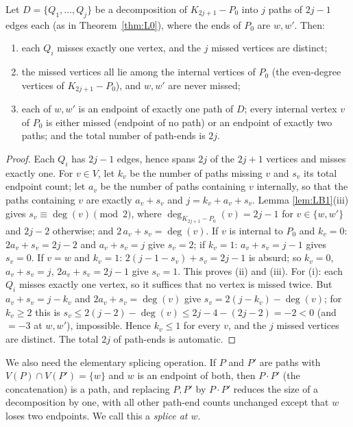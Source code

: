 \begin{lemma}\label{lem:slots}
Let $D=\{Q_1,\dots,Q_j\}$ be a decomposition of $K_{2j+1}-P_0$ into $j$ paths of $2j-1$ edges
each (as in Theorem~\ref{thm:L0}), where the ends of $P_0$ are $w,w'$. Then:
\begin{enumerate}[label={\rm(\roman*)},leftmargin=2em]
\item each $Q_i$ misses exactly one vertex, and the $j$ missed vertices are distinct;
\item the missed vertices all lie among the internal vertices of $P_0$ (the even-degree
vertices of $K_{2j+1}-P_0$), and $w,w'$ are never missed;
\item each of $w,w'$ is an endpoint of exactly one path of $D$; every internal vertex $v$ of
$P_0$ is either missed (endpoint of no path) or an endpoint of exactly two paths; and the
total number of path-ends is $2j$.
\end{enumerate}
\end{lemma}

\begin{proof}
Each $Q_i$ has $2j-1$ edges, hence spans $2j$ of the $2j+1$ vertices and misses exactly one.
For $v\in V$,
let $k_v$ be the number of paths missing $v$ and $s_v$ its total endpoint count; let $a_v$
be the number of paths containing $v$ internally, so that the paths containing $v$ are
exactly $a_v+s_v$ and $j=k_v+a_v+s_v$. Lemma
\ref{lem:LB1}(iii) gives $s_v\equiv\deg(v)\pmod 2$, where
$\deg_{K_{2j+1}-P_0}(v)=2j-1$ for $v\in\{w,w'\}$ and $2j-2$ otherwise; and
$2\,a_v+s_v=\deg(v)$. If $v$ is internal to $P_0$ and $k_v=0$:
$2a_v+s_v=2j-2$ and $a_v+s_v=j$ give $s_v=2$; if $k_v=1$: $a_v+s_v=j-1$ gives $s_v=0$. If
$v=w$ and $k_v=1$: $2(j-1-s_v)+s_v=2j-1$ is absurd; so $k_v=0$, $a_v+s_v=j$,
$2a_v+s_v=2j-1$ give $s_v=1$. This proves (ii) and (iii). For (i): each $Q_i$ misses
exactly one vertex, so it suffices that no vertex is missed twice. But
$a_v+s_v=j-k_v$ and $2a_v+s_v=\deg(v)$ give
$s_v=2(j-k_v)-\deg(v)$; for $k_v\ge2$ this is $s_v\le 2(j-2)-\deg(v)\le
2j-4-(2j-2)=-2<0$ (and $=-3$ at $w,w'$), impossible. Hence $k_v\le1$ for every $v$, and
the $j$ missed vertices are
distinct. The total $2j$ of path-ends is automatic.
\end{proof}

We also need the elementary splicing operation. If $P$ and $P'$ are paths with
$V(P)\cap V(P')=\{w\}$ and $w$ is an endpoint of both, then $P\cdot P'$ (the concatenation) is
a path, and replacing $P,P'$ by $P\cdot P'$ reduces the size of a decomposition by one, with
all other path-end counts unchanged except that $w$ loses two endpoints. We call this a
\emph{splice at $w$}.

